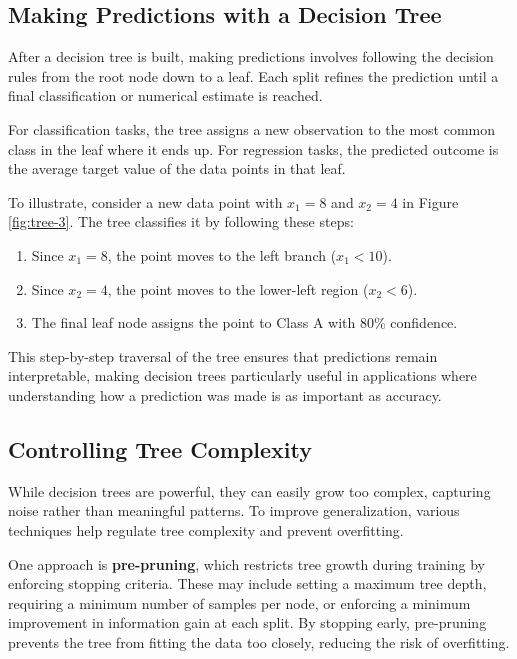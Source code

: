 \documentclass[
]{book}
\providecommand{\tightlist}{%
  \setlength{\itemsep}{0pt}\setlength{\parskip}{0pt}}
\theoremstyle{definition}
\theoremstyle{definition}
\theoremstyle{definition}
\theoremstyle{definition}
\theoremstyle{remark}
\begin{document}
\subsection*{Making Predictions with a Decision Tree}\label{making-predictions-with-a-decision-tree}

After a decision tree is built, making predictions involves following the decision rules from the root node down to a leaf. Each split refines the prediction until a final classification or numerical estimate is reached.

For classification tasks, the tree assigns a new observation to the most common class in the leaf where it ends up. For regression tasks, the predicted outcome is the average target value of the data points in that leaf.

To illustrate, consider a new data point with \(x_1 = 8\) and \(x_2 = 4\) in Figure \ref{fig:tree-3}. The tree classifies it by following these steps:

\begin{enumerate}
\def\labelenumi{\arabic{enumi}.}
\tightlist
\item
  Since \(x_1 = 8\), the point moves to the left branch (\(x_1 < 10\)).\\
\item
  Since \(x_2 = 4\), the point moves to the lower-left region (\(x_2 < 6\)).\\
\item
  The final leaf node assigns the point to Class A with 80\% confidence.
\end{enumerate}

This step-by-step traversal of the tree ensures that predictions remain interpretable, making decision trees particularly useful in applications where understanding how a prediction was made is as important as accuracy.

\subsection*{Controlling Tree Complexity}\label{controlling-tree-complexity}

While decision trees are powerful, they can easily grow too complex, capturing noise rather than meaningful patterns. To improve generalization, various techniques help regulate tree complexity and prevent overfitting.

One approach is \textbf{pre-pruning}, which restricts tree growth during training by enforcing stopping criteria. These may include setting a maximum tree depth, requiring a minimum number of samples per node, or enforcing a minimum improvement in information gain at each split. By stopping early, pre-pruning prevents the tree from fitting the data too closely, reducing the risk of overfitting.
\end{document}
